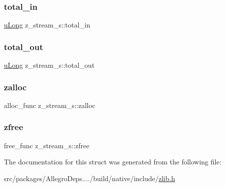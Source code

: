 \subsubsection{\texorpdfstring{total\+\_\+in}{total\_in}}
{\footnotesize\ttfamily \hyperlink{zconf_8h_acd2a5701a3aecf6700d2c66c606ecb40}{u\+Long} z\+\_\+stream\+\_\+s\+::total\+\_\+in}

\mbox{\label{structz__stream__s_abae26f1f236cf920250b9d37fdf009c1}} 
\subsubsection{\texorpdfstring{total\+\_\+out}{total\_out}}
{\footnotesize\ttfamily \hyperlink{zconf_8h_acd2a5701a3aecf6700d2c66c606ecb40}{u\+Long} z\+\_\+stream\+\_\+s\+::total\+\_\+out}

\mbox{\label{structz__stream__s_a23a2299c384f808e76e9908f21216b0f}} 
\subsubsection{\texorpdfstring{zalloc}{zalloc}}
{\footnotesize\ttfamily alloc\+\_\+func z\+\_\+stream\+\_\+s\+::zalloc}

\mbox{\label{structz__stream__s_a89eb750ade7f4f0b56bfdadf13344982}} 
\subsubsection{\texorpdfstring{zfree}{zfree}}
{\footnotesize\ttfamily free\+\_\+func z\+\_\+stream\+\_\+s\+::zfree}



The documentation for this struct was generated from the following file\+:\begin{DoxyCompactItemize}
\item 
src/packages/\+Allegro\+Deps..../build/native/include/\hyperlink{zlib_8h}{zlib.\+h}\end{DoxyCompactItemize}
